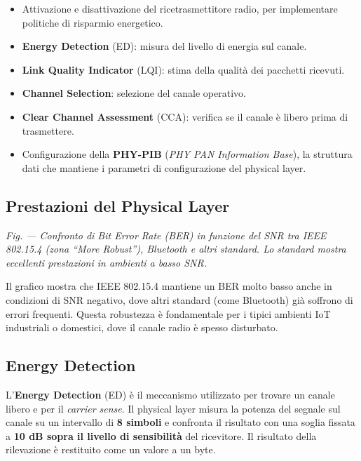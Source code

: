 \documentclass[
  italian,
  openany]{book}
\providecommand{\tightlist}{%
  \setlength{\itemsep}{0pt}\setlength{\parskip}{0pt}}
\begin{document}
\begin{itemize}
\tightlist
\item
  Attivazione e disattivazione del ricetrasmettitore radio, per
  implementare politiche di risparmio energetico.
\item
  \textbf{Energy Detection} (ED): misura del livello di energia sul
  canale.
\item
  \textbf{Link Quality Indicator} (LQI): stima della qualità dei
  pacchetti ricevuti.
\item
  \textbf{Channel Selection}: selezione del canale operativo.
\item
  \textbf{Clear Channel Assessment} (CCA): verifica se il canale è
  libero prima di trasmettere.
\item
  Configurazione della \textbf{PHY-PIB} (\emph{PHY PAN Information
  Base}), la struttura dati che mantiene i parametri di configurazione
  del physical layer.
\end{itemize}

\subsection{Prestazioni del Physical
Layer}\label{prestazioni-del-physical-layer}

\emph{Fig. --- Confronto di Bit Error Rate (BER) in funzione del SNR tra
IEEE 802.15.4 (zona ``More Robust''), Bluetooth e altri standard. Lo
standard mostra eccellenti prestazioni in ambienti a basso SNR.}

Il grafico mostra che IEEE 802.15.4 mantiene un BER molto basso anche in
condizioni di SNR negativo, dove altri standard (come Bluetooth) già
soffrono di errori frequenti. Questa robustezza è fondamentale per i
tipici ambienti IoT industriali o domestici, dove il canale radio è
spesso disturbato.

\subsection{Energy Detection}\label{energy-detection}

L'\textbf{Energy Detection} (ED) è il meccanismo utilizzato per trovare
un canale libero e per il \emph{carrier sense}. Il physical layer misura
la potenza del segnale sul canale su un intervallo di \textbf{8 simboli}
e confronta il risultato con una soglia fissata a \textbf{10 dB sopra il
livello di sensibilità} del ricevitore. Il risultato della rilevazione è
restituito come un valore a un byte.
\end{document}
